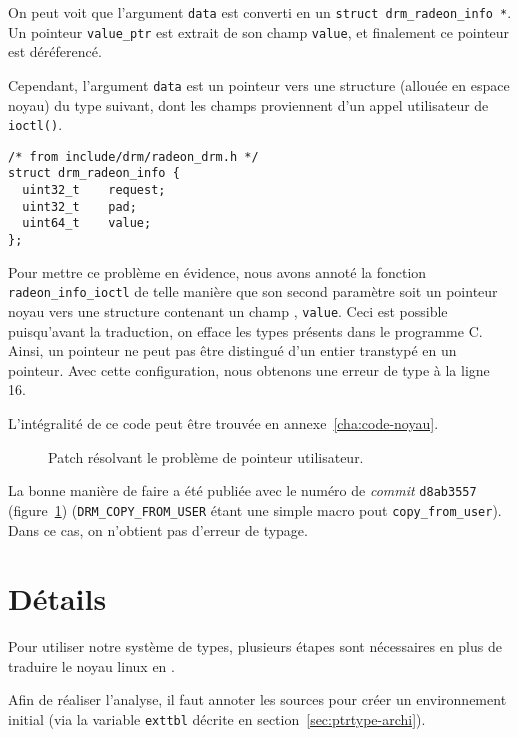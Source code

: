 On peut voit que l'argument \texttt{data} est converti en un \texttt{struct
drm\_radeon\_info *}. Un pointeur \texttt{value\_ptr} est extrait de son champ
\texttt{value}, et finalement ce pointeur est déréferencé.

Cependant, l'argument \texttt{data} est un pointeur vers une structure (allouée
en espace noyau) du type suivant, dont les champs proviennent d'un appel
utilisateur de \texttt{ioctl()}.

\begin{verbatim}
/* from include/drm/radeon_drm.h */
struct drm_radeon_info {
  uint32_t    request;
  uint32_t    pad;
  uint64_t    value;
};
\end{verbatim}

Pour mettre ce problème en évidence, nous avons annoté la fonction
\texttt{radeon\_info\_ioctl} de telle manière que son second paramètre soit un
pointeur noyau vers une structure contenant un champ \qUser, \texttt{value}.
Ceci est possible puisqu'avant la traduction, on efface les types présents dans
le programme C. Ainsi, un pointeur ne peut pas être distingué d'un entier
transtypé en un pointeur. Avec cette configuration, nous obtenons une erreur de
type à la ligne 16.

L'intégralité de ce code peut être trouvée en annexe~\ref{cha:code-noyau}.

\begin{figure}

  \caption{Patch résolvant le problème de pointeur utilisateur.}
  \label{fig:linux-patch}
\end{figure}


La bonne manière de faire a été publiée avec le numéro de \emph{commit}
\texttt{d8ab3557} (figure~\ref{fig:linux-patch}) (\texttt{DRM\_COPY\_FROM\_USER}
étant une simple macro pout \texttt{copy\_from\_user}). Dans ce cas, on
n'obtient pas d'erreur de typage.


\section{Détails}

Pour utiliser notre système de types, plusieurs étapes sont nécessaires en plus
de traduire le noyau linux en \langname.

Afin de réaliser l'analyse, il faut annoter les sources pour créer un
environnement initial (via la variable \texttt{exttbl} décrite en
section~\ref{sec:ptrtype-archi}).

